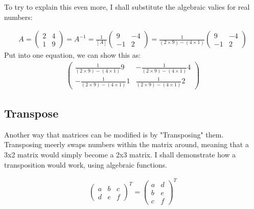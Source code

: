 \documentclass[a4paper,10pt]{article}
\begin{document}
            To try to explain this even more, I shall substitute the algebraic valies for real numbers:

            \begin{align*}
              A =
              \begin{pmatrix}
                2 & 4\\
                1 & 9
              \end{pmatrix}
              =
              A^{-1} = \frac{1}{[A]}
              \begin{pmatrix}
                9 & -4\\
                -1 & 2
              \end{pmatrix}
              =
              \frac{1}{(2 \times 9) - (4 \times 1)}
              \begin{pmatrix}
                9 & -4\\
                -1 & 2
              \end{pmatrix}
            \end{align*}
            Put into one equation, we can show this as:
            \begin{align*}
              \begin{pmatrix}
                \frac{1}{(2 \times 9) - (4 \times 1)}9 & -\frac{1}{(2 \times 9) - (4 \times 1)}4\\
                -\frac{1}{(2 \times 9) - (4 \times 1)}1 & \frac{1}{(2 \times 9) - (4 \times 1)}2
              \end{pmatrix}
            \end{align*}

      \newpage

      \subsection{Transpose}
        Another way that matrices can be modified is by "Transposing" them. Transposing meerly swaps numbers within the matrix around, meaning that a 3x2 matrix would simply become a 2x3 matrix. I shall demonstrate how a transposition would work, using algebraic functions.

        \begin{align*}
          \begin{pmatrix}
            a & b & c\\
            d & e & f
          \end{pmatrix}
          ^T
           =
          \begin{pmatrix}
            a & d\\
            b & e\\
            c & f
          \end{pmatrix}
          ^T
        \end{align*}
\end{document}
